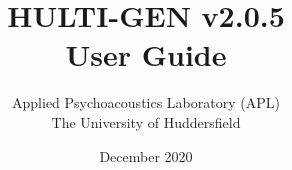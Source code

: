 \documentclass[oneside, a4paper,12pt]{book}
\begin{document}
\author{Applied Psychoacoustics Laboratory (APL) \\ The University of Huddersfield}
\title{HULTI-GEN v2.0.5 \\ User Guide}
\date{December 2020}

\maketitle
\cleardoublepage
\tableofcontents






\appendix


\end{document}
